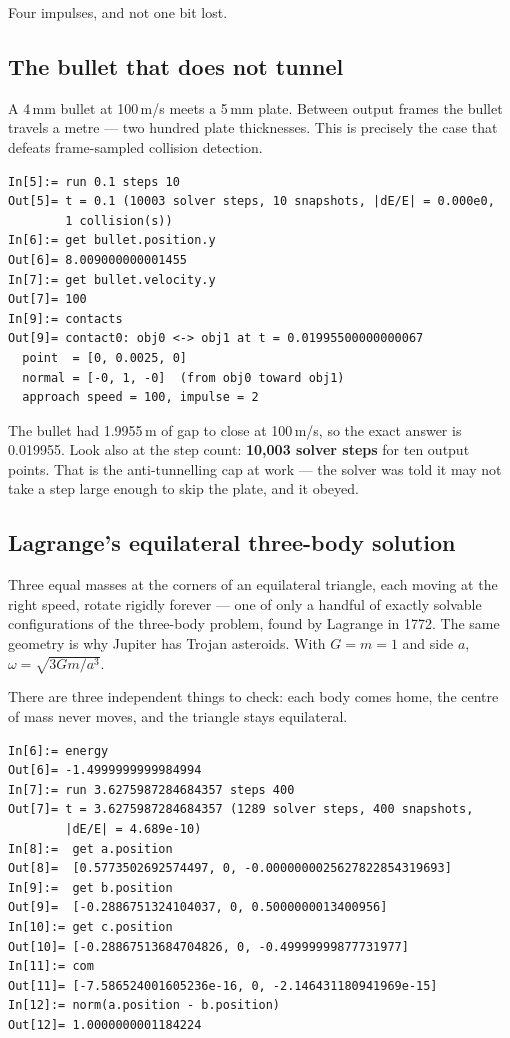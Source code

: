 \documentclass[11pt]{article}
\begin{document}
Four impulses, and not one bit lost.

\subsection{The bullet that does not tunnel}

A 4\,mm bullet at 100\,m/s meets a 5\,mm plate. Between output frames
the bullet travels a metre --- two hundred plate thicknesses. This is
precisely the case that defeats frame-sampled collision detection.

\begin{lstlisting}
In[5]:= run 0.1 steps 10
Out[5]= t = 0.1 (10003 solver steps, 10 snapshots, |dE/E| = 0.000e0,
        1 collision(s))
In[6]:= get bullet.position.y
Out[6]= 8.009000000001455
In[7]:= get bullet.velocity.y
Out[7]= 100
In[9]:= contacts
Out[9]= contact0: obj0 <-> obj1 at t = 0.01995500000000067
  point  = [0, 0.0025, 0]
  normal = [-0, 1, -0]  (from obj0 toward obj1)
  approach speed = 100, impulse = 2
\end{lstlisting}

The bullet had 1.9955\,m of gap to close at 100\,m/s, so the exact
answer is 0.019955. Look also at the step count: \textbf{10{,}003 solver
steps} for ten output points. That is the anti-tunnelling cap at work
--- the solver was told it may not take a step large enough to skip the
plate, and it obeyed.

\subsection{Lagrange's equilateral three-body solution}

Three equal masses at the corners of an equilateral triangle, each
moving at the right speed, rotate rigidly forever --- one of only a
handful of exactly solvable configurations of the three-body problem,
found by Lagrange in 1772. The same geometry is why Jupiter has Trojan
asteroids. With $G=m=1$ and side $a$, $\omega = \sqrt{3Gm/a^3}$.

There are three independent things to check: each body comes home, the
centre of mass never moves, and the triangle stays equilateral.

\begin{lstlisting}
In[6]:= energy
Out[6]= -1.4999999999984994
In[7]:= run 3.6275987284684357 steps 400
Out[7]= t = 3.6275987284684357 (1289 solver steps, 400 snapshots,
        |dE/E| = 4.689e-10)
In[8]:=  get a.position
Out[8]=  [0.5773502692574497, 0, -0.0000000025627822854319693]
In[9]:=  get b.position
Out[9]=  [-0.2886751324104037, 0, 0.5000000013400956]
In[10]:= get c.position
Out[10]= [-0.28867513684704826, 0, -0.49999999877731977]
In[11]:= com
Out[11]= [-7.586524001605236e-16, 0, -2.146431180941969e-15]
In[12]:= norm(a.position - b.position)
Out[12]= 1.0000000001184224
\end{lstlisting}
\end{document}
